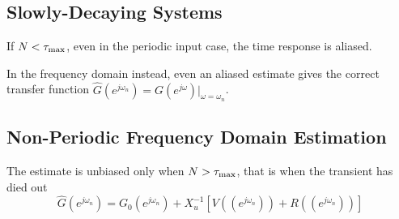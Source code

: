 \subsection{Slowly-Decaying Systems}
\label{sec:slowly-decaying-systems}

If $N<\tau_\text{max}$, even in the periodic input case, the time response is aliased.



In the frequency domain instead, even an aliased estimate gives the correct transfer function $\hat{G}(e^{j\omega_n}) = G(e^{j\omega})|_{\omega=\omega_n}$.

\subsection{Non-Periodic Frequency Domain Estimation}

The estimate is unbiased only when $N>\tau_\text{max}$, that is when the transient has died out
\begin{equation*}
  \hat{G}(e^{j\omega_n}) = G_0(e^{j\omega_n}) + X_u^{-1}\left[V((e^{j\omega_n})) + R((e^{j\omega_n}))\right]
\end{equation*}
\fi

